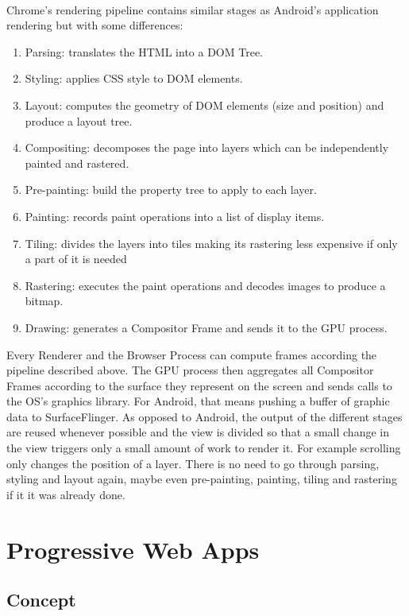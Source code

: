 \documentclass{kththesis}
\begin{document}
\paragraph{}
Chrome's rendering pipeline \cite{chrome_pixel} contains similar stages as Android's application rendering but with some differences: 
\begin{enumerate}
    \item Parsing: translates the HTML into a DOM Tree.
    \item Styling: applies CSS style to DOM elements.
    \item Layout: computes the geometry of DOM elements (size and position) and produce a layout tree.
    \item Compositing: decomposes the page into layers which can be independently painted and rastered.
    \item Pre-painting: build the property tree to apply to each layer.
    \item Painting: records paint operations into a list of display items.
    \item Tiling: divides the layers into tiles making its rastering less expensive if only a part of it is needed
    \item Rastering: executes the paint operations and decodes images to produce a bitmap.
    \item Drawing: generates a Compositor Frame and sends it to the GPU process.
\end{enumerate}
Every Renderer and the Browser Process can compute frames according the pipeline described above. The GPU process then aggregates all Compositor Frames according to the surface they represent on the screen  and sends calls to the OS's graphics library. For Android, that means pushing a buffer of graphic data to SurfaceFlinger.
\newline
As opposed to Android, the output of the different stages are reused whenever possible and the view is divided so that a small change in the view triggers only a small amount of work to render it. 
For example scrolling only changes the position of a layer. There is no need to go through parsing, styling and layout again, maybe even pre-painting, painting, tiling and rastering if it it was already done.

\section{Progressive Web Apps}

\subsection{Concept}
\end{document}
